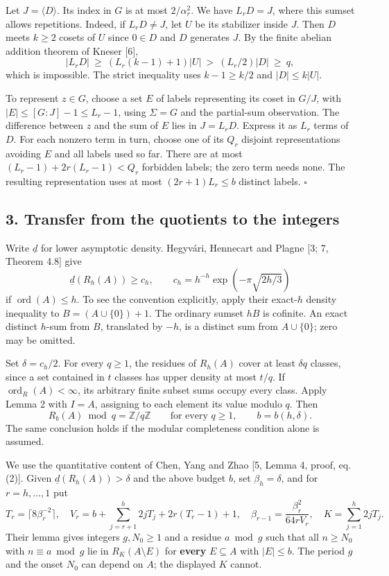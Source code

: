 \documentclass[
  11pt,
]{article}
\begin{document}
Let \(J=\langle D\rangle\). Its index in \(G\) is at most
\(2/\alpha_r^2\). We have \(L_rD=J\), where this sumset allows
repetitions. Indeed, if \(L_rD\ne J\), let \(U\) be its stabilizer
inside \(J\). Then \(D\) meets \(k\ge2\) cosets of \(U\) since
\(0\in D\) and \(D\) generates \(J\). By the finite abelian addition
theorem of Kneser {[}6{]}, \[
|L_rD|\ \ge\ (L_r(k-1)+1)|U|\ >\ (L_r/2)|D|\ \ge\ q,
\] which is impossible. The strict inequality uses \(k-1\ge k/2\) and
\(|D|\le k|U|\).

To represent \(z\in G\), choose a set \(E\) of labels representing its
coset in \(G/J\), with \(|E|\le [G:J]-1\le L_r-1\), using \(\Sigma=G\)
and the partial-sum observation. The difference between \(z\) and the
sum of \(E\) lies in \(J=L_rD\). Express it as \(L_r\) terms of \(D\).
For each nonzero term in turn, choose one of its \(Q_r\) disjoint
representations avoiding \(E\) and all labels used so far. There are at
most \((L_r-1)+2r(L_r-1)<Q_r\) forbidden labels; the zero term needs
none. The resulting representation uses at most \((2r+1)L_r\le b\)
distinct labels. \(\square\)

\subsection{3. Transfer from the quotients to the
integers}\label{transfer-from-the-quotients-to-the-integers}

Write \(\underline d\) for lower asymptotic density. Hegyvári, Hennecart
and Plagne {[}3; 7, Theorem 4.8{]} give \[
\underline d(R_h(A))\ge c_h,\qquad
c_h=h^{-h}\exp(-\pi\sqrt{2h/3})
\] if \(\operatorname{ord}(A)\le h\). To see the convention explicitly,
apply their exact-\(h\) density inequality to \(B=(A\cup\{0\})+1\). The
ordinary sumset \(hB\) is cofinite. An exact distinct \(h\)-sum from
\(B\), translated by \(-h\), is a distinct sum from \(A\cup\{0\}\); zero
may be omitted.

Set \(\delta=c_h/2\). For every \(q\ge1\), the residues of \(R_h(A)\)
cover at least \(\delta q\) classes, since a set contained in \(t\)
classes has upper density at most \(t/q\). If
\(\operatorname{ord}_R(A)<\infty\), its arbitrary finite subset sums
occupy every class. Apply Lemma 2 with \(I=A\), assigning to each
element its value modulo \(q\). Then \[
R_b(A)\bmod q=\mathbb Z/q\mathbb Z\qquad\text{for every }q\ge1,
\qquad b=b(h,\delta).
\] The same conclusion holds if the modular completeness condition alone
is assumed.

We use the quantitative content of Chen, Yang and Zhao {[}5, Lemma 4,
proof, eq. (2){]}. Given \(\underline d(R_h(A))>\delta\) and the above
budget \(b\), set \(\beta_h=\delta\), and for \(r=h,\dots,1\) put \[
T_r=\lceil 8\beta_r^{-2}\rceil,\quad
V_r=b+\sum_{j=r+1}^h 2jT_j+2r(T_r-1)+1,\quad
\beta_{r-1}=\frac{\beta_r^2}{64rV_r},\quad K=\sum_{j=1}^h2jT_j.
\] Their lemma gives integers \(g,N_0\ge1\) and a residue \(a\bmod g\)
such that all \(n\ge N_0\) with \(n\equiv a\bmod g\) lie in
\(R_K(A\setminus E)\) for \textbf{every} \(E\subseteq A\) with
\(|E|\le b\). The period \(g\) and the onset \(N_0\) can depend on
\(A\); the displayed \(K\) cannot.
\end{document}
